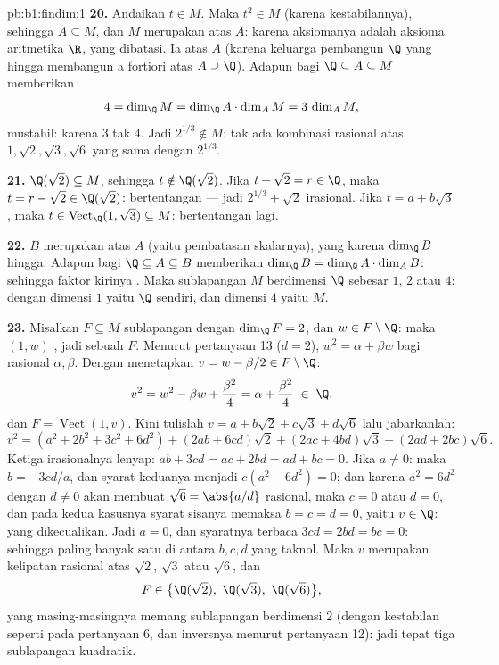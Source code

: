 \begin{solution}{pb:b1:findim:1}
\textbf{20.} Andaikan $t \in M$. Maka $t^2 \in M$ (karena kestabilannya), sehingga
$A \subseteq M$, dan $M$ merupakan  atas  $A$:
karena aksiomanya adalah aksioma aritmetika $\R$, yang dibatasi. Ia
 atas $A$ (karena keluarga pembangun $\Q$ yang hingga
membangun a fortiori atas $A \supseteq \Q$). Adapun  bagi
$\Q \subseteq A \subseteq M$ memberikan
\[
4 = \dim_\Q M = \dim_\Q A \cdot \dim_A M = 3\,\dim_A M ,
\]
mustahil: karena $3$ tak  $4$. Jadi $2^{1/3} \notin M$: tak ada
kombinasi rasional atas $1, \sqrt2, \sqrt3, \sqrt6$ yang sama dengan
$2^{1/3}$.

\textbf{21.} $\Q(\sqrt2) \subseteq M$, sehingga $t \notin \Q(\sqrt2)$.
Jika $t + \sqrt2 = r \in \Q$, maka $t = r - \sqrt2 \in \Q(\sqrt2)$:
bertentangan --- jadi $2^{1/3} + \sqrt2$ irasional. Jika $t = a +
b\sqrt3$, maka $t \in \operatorname{Vect}_\Q(1, \sqrt3) \subseteq
M$: bertentangan lagi.

\textbf{22.} $B$ merupakan  atas  $A$
(yaitu pembatasan skalarnya), yang  karena $\dim_\Q B$
hingga. Adapun  bagi $\Q \subseteq A \subseteq B$ memberikan
$\dim_\Q B = \dim_\Q A \cdot \dim_A B$: sehingga faktor kirinya .
Maka sublapangan $M$ berdimensi $\Q$ sebesar $1$, $2$ atau $4$:
dengan dimensi $1$ yaitu $\Q$ sendiri, dan dimensi $4$ yaitu $M$.

\textbf{23.} Misalkan $F \subseteq M$ sublapangan dengan $\dim_\Q F =
2$, dan $w \in F \setminus \Q$: maka $(1, w)$ , jadi sebuah 
$F$. Menurut pertanyaan 13 ($d = 2$), $w^2 = \alpha + \beta w$ bagi
rasional $\alpha, \beta$. Dengan menetapkan $v = w - \beta/2 \in F
\setminus \Q$:
\[
v^2 = w^2 - \beta w + \frac{\beta^2}4 = \alpha + \frac{\beta^2}4
\;\in\; \Q,
\]
dan $F = \operatorname{Vect}(1, v)$. Kini tulislah $v = a + b\sqrt2 +
c\sqrt3 + d\sqrt6$ lalu jabarkanlah:
\[
v^2 = (a^2 + 2b^2 + 3c^2 + 6d^2)
+ (2ab + 6cd)\sqrt2 + (2ac + 4bd)\sqrt3 + (2ad + 2bc)\sqrt6 .
\]
Ketiga  irasionalnya lenyap: $ab + 3cd = ac + 2bd =
ad + bc = 0$. Jika $a \neq 0$: maka $b = -3cd/a$, dan syarat
keduanya menjadi $c(a^2 - 6d^2) = 0$; dan karena $a^2 = 6d^2$ dengan $d
\neq 0$ akan membuat $\sqrt6 = \abs{a/d}$ rasional, maka $c = 0$
atau $d = 0$, dan pada kedua kasusnya syarat sisanya memaksa $b =
c = d = 0$, yaitu $v \in \Q$: yang dikecualikan. Jadi $a = 0$, dan
syaratnya terbaca $3cd = 2bd = bc = 0$: sehingga paling banyak satu di antara $b, c, d$ yang
taknol. Maka $v$ merupakan kelipatan rasional atas $\sqrt2$, $\sqrt3$
atau $\sqrt6$, dan
\[
F \in \bigl\{\Q(\sqrt2),\ \Q(\sqrt3),\ \Q(\sqrt6)\bigr\} ,
\]
yang masing-masingnya memang sublapangan berdimensi $2$ (dengan kestabilan seperti
pada pertanyaan 6, dan inversnya menurut pertanyaan 12): jadi tepat tiga
sublapangan kuadratik.


\end{solution}
